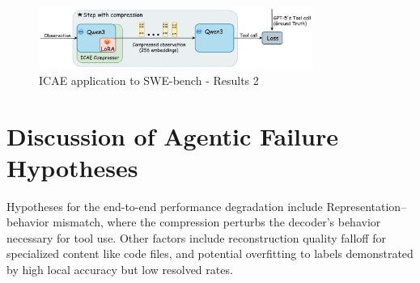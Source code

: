 \begin{figure}[hbt]
  \centering
  \includegraphics[width=0.8\textwidth]{graphs/mega-2.jpeg}
  \caption{ICAE application to SWE-bench - Results 2}
  \label{fig:mega2}
\end{figure}


\section{Discussion of Agentic Failure Hypotheses}

Hypotheses for the end-to-end performance degradation include Representation–behavior mismatch, where the compression perturbs the decoder's behavior necessary for tool use.
Other factors include reconstruction quality falloff for specialized content like code files, and potential overfitting to labels demonstrated by high local accuracy but low resolved rates.
